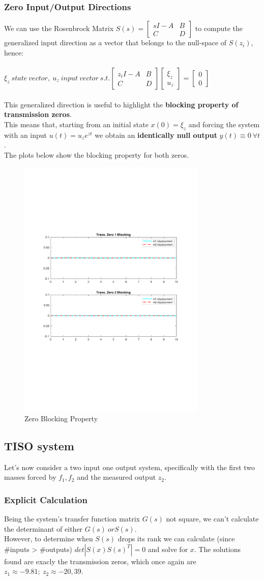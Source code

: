 \documentclass[a4paper, 12pt]{article}
\def\FigureFive{\centering\includegraphics[width=0.8\textwidth]{Figures/fig05.pdf}}
\begin{document}
\subsubsection{Zero Input/Output Directions}
We can use the Rosenbrock Matrix $S(s) = 
\begin{bmatrix}
sI-A & B\\
C & D
\end{bmatrix}$ to compute the generalized input direction as a vector that belongs to the null-space of $S(z_i)$, hence:\\ \\
$\xi_z\ state\ vector,\ u_z\ input\ vector\ s.t. \begin{bmatrix}
z_iI-A & B\\
C & D
\end{bmatrix}
\begin{bmatrix}
\xi_z\\
u_z
\end{bmatrix} = 
\begin{bmatrix}
0\\
0
\end{bmatrix}$
\\\\This generalized direction is useful to highlight the \textbf{blocking property of transmission zeros}.
\\This means that, starting from an initial state $x(0) = \xi_z$ and forcing the system with an input $u(t) = u_z e^{zt}$ we obtain an \textbf{identically null output} $y(t) \equiv 0 \ \forall t$.
\\The plots below show the blocking property for both zeros.
\begin{figure}[h!]
    \FigureFive
    \caption{Zero Blocking Property}
    \label{fig:fig05}
\end{figure}
\subsection{TISO system}
Let's now consider a two input one output system, specifically with the first two masses forced by $f_1,f_2$ and the measured output $z_2$.
\subsubsection{Explicit Calculation}
Being the system's transfer function matrix $G(s)$ not square, we can't calculate the determinant of either $G(s)\ or S(s)$.
\\However, to determine when $S(s)$ drops its rank we can calculate (since \#inputs > \#outputs) $det|S(x)S(s)^T| = 0$  and solve for $x$.  
The solutions found are exacly the transmission zeros, which once again are $z_1 \approx -9.81;\ z_2 \approx -20,39$.
\end{document}
